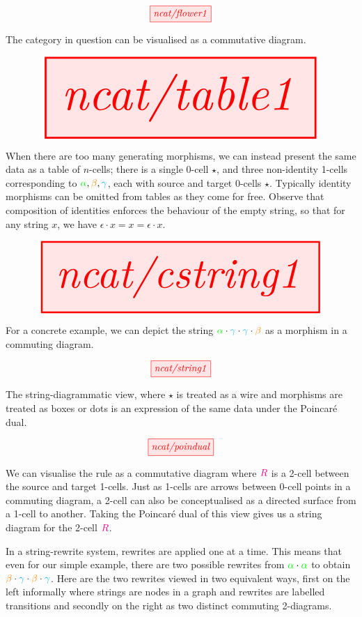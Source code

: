 \begin{marginfigure}
\centering
\[\tikzfig{ncat/flower1}\]
\caption{The category in question can be visualised as a commutative diagram.}
\end{marginfigure}

\begin{marginfigure}
\centering
\[\resizebox{\textwidth}{!}{\tikzfig{ncat/table1}}\]
\caption{When there are too many generating morphisms, we can instead present the same data as a table of $n$-cells; there is a single 0-cell $\star$, and three non-identity 1-cells corresponding to $\textcolor{green}{\alpha}, \textcolor{orange}{\beta}, \textcolor{cyan}{\gamma}$, each with source and target 0-cells $\star$. Typically identity morphisms can be omitted from tables as they come for free. Observe that composition of identities enforces the behaviour of the empty string, so that for any string $x$, we have $\epsilon \cdot x = x = \epsilon \cdot x$.}
\end{marginfigure}

\begin{marginfigure}
\centering
\[\resizebox{\textwidth}{!}{\tikzfig{ncat/cstring1}}\]
\caption{For a concrete example, we can depict the string $\textcolor{green}{\alpha} \cdot \textcolor{cyan}{\gamma} \cdot \textcolor{cyan}{\gamma} \cdot \textcolor{orange}{\beta}$ as a morphism in a commuting diagram.}
\end{marginfigure}

\begin{marginfigure}
\centering
\[\tikzfig{ncat/string1}\]
\caption{The string-diagrammatic view, where $\star$ is treated as a wire and morphisms are treated as boxes or dots is an expression of the same data under the Poincar\'{e} dual.}
\end{marginfigure}

\begin{marginfigure}\label{fig:ruleR}
\centering
\[\tikzfig{ncat/poindual}\]
\caption{We can visualise the rule as a commutative diagram where $\textcolor{magenta}{R}$ is a 2-cell between the source and target 1-cells. Just as 1-cells are arrows between 0-cell points in a commuting diagram, a 2-cell can also be conceptualised as a directed surface from a 1-cell to another. Taking the Poincar\'{e} dual of this view gives us a string diagram for the 2-cell $\textcolor{magenta}{R}$.}
\end{marginfigure}

 In a string-rewrite system, rewrites are applied one at a time. This means that even for our simple example, there are two possible rewrites from $\textcolor{green}{\alpha} \cdot \textcolor{green}{\alpha}$ to obtain $\textcolor{orange}{\beta} \cdot \textcolor{cyan}{\gamma} \cdot \textcolor{orange}{\beta} \cdot \textcolor{cyan}{\gamma}$. Here are the two rewrites viewed in two equivalent ways, first on the left informally where strings are nodes in a graph and rewrites are labelled transitions and secondly on the right as two distinct commuting 2-diagrams.

